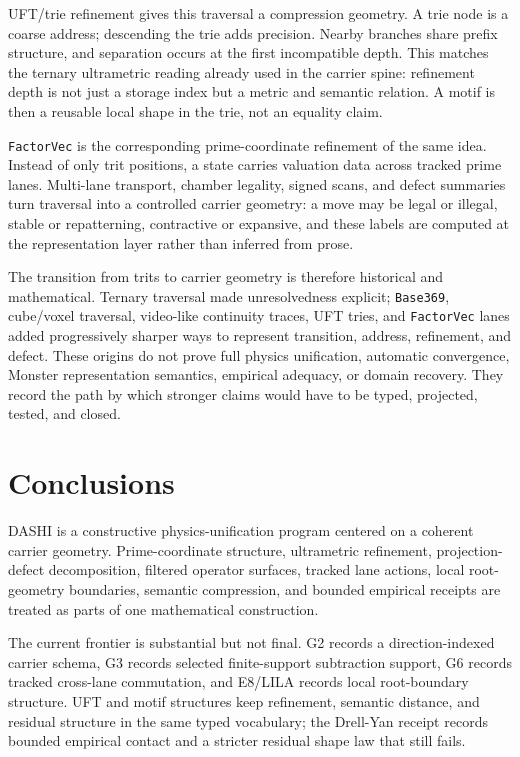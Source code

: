 \documentclass[11pt]{article}
\theoremstyle{definition}
\theoremstyle{plain}
\theoremstyle{remark}
\begin{document}
UFT/trie refinement gives this traversal a compression geometry. A trie node is
a coarse address; descending the trie adds precision. Nearby branches share
prefix structure, and separation occurs at the first incompatible depth. This
matches the ternary ultrametric reading already used in the carrier spine:
refinement depth is not just a storage index but a metric and semantic
relation. A motif is then a reusable local shape in the trie, not an equality
claim.

\texttt{FactorVec} is the corresponding prime-coordinate refinement of the
same idea. Instead of only trit positions, a state carries valuation data
across tracked prime lanes. Multi-lane transport, chamber legality, signed
scans, and defect summaries turn traversal into a controlled carrier geometry:
a move may be legal or illegal, stable or repatterning, contractive or
expansive, and these labels are computed at the representation layer rather
than inferred from prose.

The transition from trits to carrier geometry is therefore historical and
mathematical. Ternary traversal made unresolvedness explicit; \texttt{Base369},
cube/voxel traversal, video-like continuity traces, UFT tries, and
\texttt{FactorVec} lanes added progressively sharper ways to represent
transition, address, refinement, and defect. These origins do not prove full
physics unification, automatic convergence, Monster representation semantics,
empirical adequacy, or domain recovery. They record the path by which stronger
claims would have to be typed, projected, tested, and closed.

\section{Conclusions}

DASHI is a constructive physics-unification program centered on a coherent
carrier geometry. Prime-coordinate structure, ultrametric refinement,
projection-defect decomposition, filtered operator surfaces, tracked lane
actions, local root-geometry boundaries, semantic compression, and bounded
empirical receipts are treated as parts of one mathematical construction.

The current frontier is substantial but not final. G2 records a
direction-indexed carrier schema, G3 records selected finite-support
subtraction support, G6 records tracked cross-lane commutation, and E8/LILA
records local root-boundary structure. UFT and motif structures keep refinement,
semantic distance, and residual structure in the same typed vocabulary; the
Drell-Yan receipt records bounded empirical contact and a stricter residual
shape law that still fails.
\end{document}
